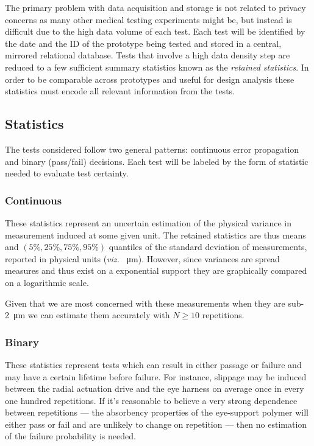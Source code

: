\documentclass{article}
\begin{document}
The primary problem with data acquisition and storage is not related to privacy concerns as many other medical testing experiments might be, but instead is difficult due to the high data volume of each test. Each test will be identified by the date and the ID of the prototype being tested and stored in a central, mirrored relational database. Tests that involve a high data density step are reduced to a few sufficient summary statistics known as the \textit{retained statistics}. In order to be comparable across prototypes and useful for design analysis these statistics must encode all relevant information from the tests.

\subsection{Statistics}
\label{sec:statistics}

The tests considered follow two general patterns: continuous error
propagation and binary (pass/fail) decisions. Each test will be
labeled by the form of statistic needed to evaluate test certainty.

\subsubsection{Continuous}
\label{sec:continuous}

These statistics represent an uncertain estimation of the physical variance in measurement induced at some given unit. The retained statistics are thus means and $(5\%, 25\%, 75\%, 95\%)$ quantiles of the standard deviation of measurements, reported in physical units (\textit{viz.} \SI{}{\micro m}). However, since variances are spread measures and thus exist on a exponential support they are graphically compared on a logarithmic scale.

Given that we are most concerned with these measurements when they are sub-\SI{2}{\micro m} we can estimate them accurately with $N \ge 10$ repetitions.

\subsubsection{Binary}
\label{sec:binary}

These statistics represent tests which can result in either passage or failure and may have a certain lifetime before failure. For instance, slippage may be induced between the radial actuation drive and the eye harness on average once in every one hundred repetitions. If it's reasonable to believe a very strong dependence between repetitions --- the absorbency properties of the eye-support polymer will either pass or fail and are unlikely to change on repetition --- then no estimation of the failure probability is needed.
\end{document}
